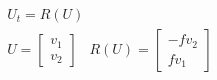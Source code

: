 \documentclass[10pt]{article} %
\begin{document}
\color{fgC}\[\begin{matrix}
 U_t = R(U)  \\ 
 U = \begin{bmatrix}
 v_1 \\ 
 v_2
 \end{bmatrix}\;\;\;
 R(U) = \begin{bmatrix}
 -f v_2 \\ 
 f v_1
 \end{bmatrix} 
\end{matrix}\]
\end{document}
